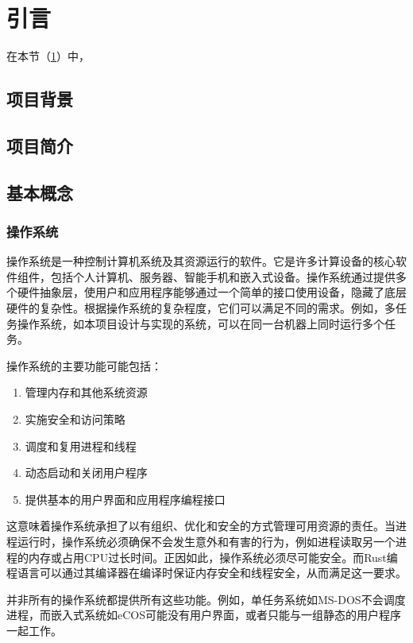 \section{引言}\label{sec:Introduction}

在本节（\cref{sec:Introduction}）中，

\subsection{项目背景}

\subsection{项目简介}

\subsection{基本概念}

\subsubsection{操作系统}

操作系统是一种控制计算机系统及其资源运行的软件。它是许多计算设备的核心软件组件，包括个人计算机、服务器、智能手机和嵌入式设备。操作系统通过提供多个硬件抽象层，使用户和应用程序能够通过一个简单的接口使用设备，隐藏了底层硬件的复杂性。根据操作系统的复杂程度，它们可以满足不同的需求。例如，多任务操作系统，如本项目设计与实现的系统，可以在同一台机器上同时运行多个任务。

操作系统的主要功能可能包括：

\begin{enumerate}
    \item 管理内存和其他系统资源
    \item 实施安全和访问策略
    \item 调度和复用进程和线程
    \item 动态启动和关闭用户程序
    \item 提供基本的用户界面和应用程序编程接口
\end{enumerate}

这意味着操作系统承担了以有组织、优化和安全的方式管理可用资源的责任。当进程运行时，操作系统必须确保不会发生意外和有害的行为，例如进程读取另一个进程的内存或占用CPU过长时间。正因如此，操作系统必须尽可能安全。而Rust编程语言可以通过其编译器在编译时保证内存安全和线程安全，从而满足这一要求。

并非所有的操作系统都提供所有这些功能。例如，单任务系统如MS-DOS不会调度进程，而嵌入式系统如eCOS可能没有用户界面，或者只能与一组静态的用户程序一起工作。

